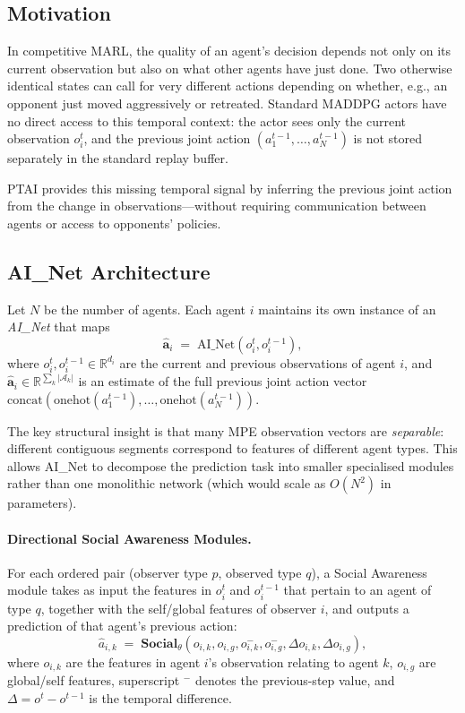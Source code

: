 \documentclass[12pt]{article}
\begin{document}
\subsection{Motivation}

In competitive MARL, the quality of an agent's decision depends not only on its current
observation but also on what other agents have just done. Two otherwise identical states
can call for very different actions depending on whether, e.g., an opponent just moved
aggressively or retreated. Standard MADDPG actors have no direct access to this temporal
context: the actor sees only the current observation $o^t_i$, and the previous joint action
$(a^{t-1}_1, \ldots, a^{t-1}_N)$ is not stored separately in the standard replay buffer.

PTAI provides this missing temporal signal by inferring the previous joint action from
the change in observations---without requiring communication between agents or access to
opponents' policies.

\subsection{AI\_Net Architecture}

Let $N$ be the number of agents. Each agent $i$ maintains its own instance of an
\emph{AI\_Net} that maps
\begin{equation}
\widehat{\mathbf{a}}_i \;=\; \text{AI\_Net}(o^t_i, o^{t-1}_i),
\label{eq:ainet}
\end{equation}
where $o^t_i, o^{t-1}_i \in \mathbb{R}^{d_i}$ are the current and previous observations
of agent $i$, and $\widehat{\mathbf{a}}_i \in \mathbb{R}^{\sum_k |\mathcal{A}_k|}$ is an
estimate of the full previous joint action vector
$\text{concat}(\text{onehot}(a^{t-1}_1), \ldots, \text{onehot}(a^{t-1}_N))$.

The key structural insight is that many MPE observation vectors are \emph{separable}:
different contiguous segments correspond to features of different agent types. This
allows AI\_Net to decompose the prediction task into smaller specialised modules rather
than one monolithic network (which would scale as $O(N^2)$ in parameters).

\paragraph{Directional Social Awareness Modules.}
For each ordered pair (observer type $p$, observed type $q$), a Social Awareness module
takes as input the features in $o^t_i$ and $o^{t-1}_i$ that pertain to an agent of type
$q$, together with the self/global features of observer $i$, and outputs a prediction of
that agent's previous action:
\begin{equation}
\widehat{a}_{i,k} \;=\; \mathbf{Social}_\theta(o_{i,k}, o_{i,g},
  o^-_{i,k}, o^-_{i,g}, \Delta o_{i,k}, \Delta o_{i,g}),
\end{equation}
where $o_{i,k}$ are the features in agent $i$'s observation relating to agent $k$,
$o_{i,g}$ are global/self features, superscript $^-$ denotes the previous-step value,
and $\Delta = o^t - o^{t-1}$ is the temporal difference.
\end{document}
